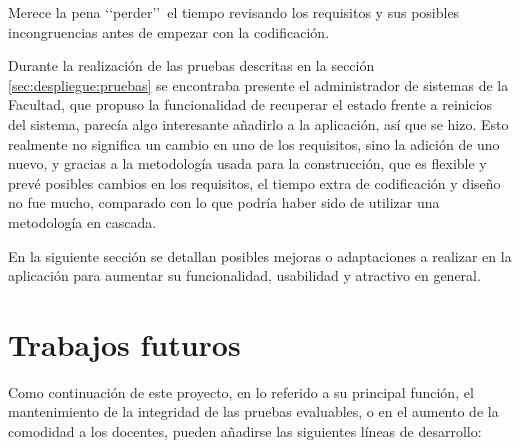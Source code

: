 Merece la pena \lq\lq perder\rq\rq \ el tiempo revisando los requisitos y sus posibles incongruencias antes de empezar con la codificación.
\newline


Durante la realización de las pruebas descritas en la sección \ref{sec:despliegue:pruebas} se encontraba presente el administrador de sistemas de la Facultad, que propuso la funcionalidad de recuperar el estado frente a reinicios del sistema, parecía algo interesante añadirlo a la aplicación, así que se hizo. Esto realmente no significa un cambio en uno de los requisitos, sino la adición de uno nuevo, y gracias a la metodología usada para la construcción, que es flexible y prevé posibles cambios en los requisitos, el tiempo extra de codificación y diseño no fue mucho, comparado con lo que podría haber sido de utilizar una metodología en cascada.
\newline

En la siguiente sección se detallan posibles mejoras o adaptaciones a realizar en la aplicación para aumentar su funcionalidad, usabilidad y atractivo en general.

\section{Trabajos futuros}
\label{sec:futuro:futuro}

Como continuación de este proyecto, en lo referido a su principal función, el mantenimiento de la integridad de las pruebas evaluables, o en el aumento de la comodidad a los docentes, pueden añadirse las siguientes líneas de desarrollo:

